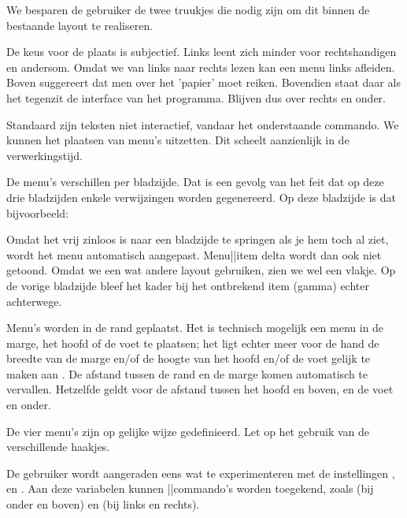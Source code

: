 \typebuffer[voorb-1]

We besparen de gebruiker de twee truukjes die nodig zijn om
dit binnen de bestaande layout te realiseren. 

De keus voor de plaats is subjectief. Links leent zich minder
voor rechtshandigen en andersom. Omdat we van links naar 
rechts lezen kan een menu links afleiden. Boven suggereert 
dat men over het 'papier' moet reiken. Bovendien staat daar 
als het tegenzit de interface van het programma. Blijven dus 
over rechts en onder.  

Standaard zijn teksten niet interactief, vandaar het
onderstaande comman\-do. We kunnen het plaatsen van menu's
uitzetten. Dit scheelt aanzienlijk in de verwerkingstijd. 

\typebuffer[voorb-2]

De menu's verschillen per bladzijde. Dat is een gevolg van 
het feit dat op deze drie bladzijden enkele verwijzingen 
worden gegenereerd. Op deze bladzijde is dat bijvoorbeeld:

\starttypen
\paginareferentie[menu:a]
\paginareferentie[menu:b]
\stoptypen

\pagina

\paginareferentie[menu:c]

\haalbuffer[voorb-5]

Omdat het vrij zinloos is naar een bladzijde te springen
als je hem toch al ziet, wordt het menu automatisch
aangepast. Menu||item delta wordt dan ook niet getoond. Omdat 
we een wat andere layout gebruiken, zien we wel een vlakje. 
Op de vorige bladzijde bleef het kader bij het ontbrekend 
item \type{[menu:c]} (gamma) echter achterwege. 

\typebuffer[voorb-5]

Menu's worden in de rand geplaatst. Het is technisch
mogelijk een menu in de marge, het hoofd of de voet te
plaatsen; het ligt echter meer voor de hand de breedte van
de marge en/of de hoogte van het hoofd en/of de voet gelijk
te maken aan \type{0cm}. De afstand tussen de rand en de
marge komen automatisch te vervallen. Hetzelfde geldt voor
de afstand tussen het hoofd en boven, en de voet en onder. 

De vier menu's zijn op gelijke wijze gedefinieerd. Let op het
gebruik van de verschillende haakjes. 

\typebuffer[voorb-3]

\pagina

\paginareferentie[menu:d]

De gebruiker wordt aangeraden eens wat te experimenteren met
de instellingen ,  en . Aan
deze variabelen kunnen \kap{\TeX}||commando's worden
toegekend, zoals \type{\hfill} (bij onder en boven) en
\type{\vfill} (bij links en rechts). 

